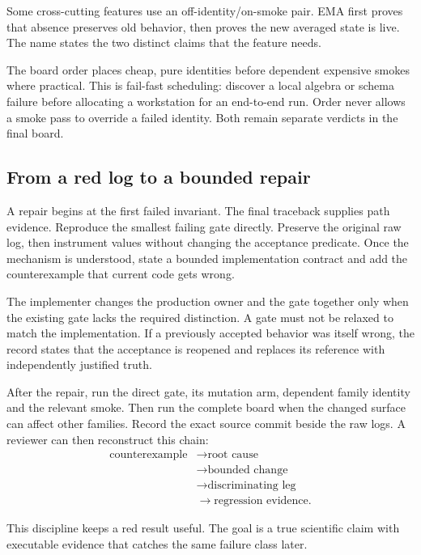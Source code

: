 \documentclass[10pt,aps,prd,twocolumn,nofootinbib]{revtex4-2}
\begin{document}
Some cross-cutting features use an off-identity/on-smoke pair.  EMA
first proves that absence preserves old behavior, then proves the new averaged
state is live.  The name states the two distinct claims that the feature needs.

The board order places cheap, pure identities before dependent expensive
smokes where practical.  This is fail-fast scheduling: discover a local
algebra or schema failure before allocating a workstation for an end-to-end
run.  Order never allows a smoke pass to override a failed identity.  Both
remain separate verdicts in the final board.

\subsection{From a red log to a bounded repair}

A repair begins at the first failed invariant.  The final traceback supplies
path evidence.  Reproduce the smallest failing gate directly.  Preserve the original raw log,
then instrument values without changing the acceptance predicate.  Once the
mechanism is understood, state a bounded implementation contract and add the
counterexample that current code gets wrong.

The implementer changes the production owner and the gate together only when
the existing gate lacks the required distinction.  A gate must not be relaxed
to match the implementation.  If a previously accepted behavior was itself
wrong, the record states that the acceptance is reopened and replaces its
reference with independently justified truth.

After the repair, run the direct gate, its mutation arm, dependent family
identity and the relevant smoke.  Then run the complete board when the changed
surface can affect other families.  Record the exact source commit beside the
raw logs.  A reviewer can then reconstruct this chain:
\begin{align*}
 \text{counterexample}&\rightarrow\text{root cause}\\
 &\rightarrow\text{bounded change}\\
 &\rightarrow\text{discriminating leg}\\
 &\rightarrow\text{regression evidence}.
\end{align*}

This discipline keeps a red result useful.  The goal is a true scientific
claim with executable evidence that catches the same failure class later.
\end{document}

